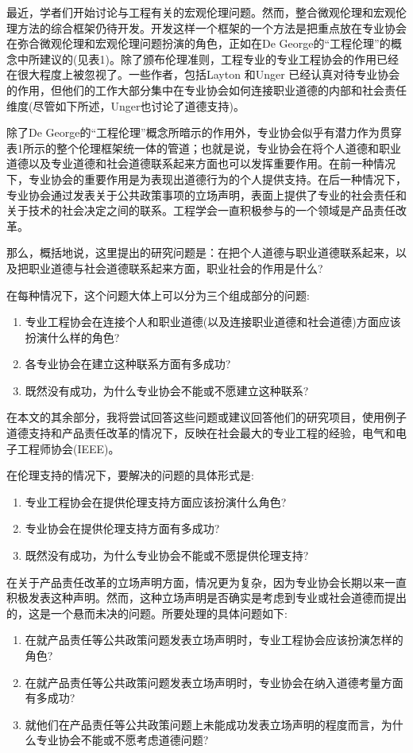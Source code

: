 \documentclass[lang=cn,11pt,a4paper]{elegantpaper}
\begin{document}
最近，学者们开始讨论与工程有关的宏观伦理问题\cite{9,10,11}。然而，整合微观伦理和宏观伦理方法的综合框架仍待开发。开发这样一个框架的一个方法是把重点放在专业协会在弥合微观伦理和宏观伦理问题扮演的角色，正如在De George的“工程伦理”的概念中所建议的(见表1)。除了颁布伦理准则，工程专业的专业工程协会的作用已经在很大程度上被忽视了。一些作者，包括Layton \cite{12}和Unger\cite{13} 已经认真对待专业协会的作用，但他们的工作大部分集中在专业协会如何连接职业道德的内部和社会责任维度(尽管如下所述，Unger也讨论了道德支持)。

除了De George的“工程伦理”概念所暗示的作用外，专业协会似乎有潜力作为贯穿表1所示的整个伦理框架统一体的管道；也就是说，专业协会在将个人道德和职业道德以及专业道德和社会道德联系起来方面也可以发挥重要作用。在前一种情况下，专业协会的重要作用是为表现出道德行为的个人提供支持。在后一种情况下，专业协会通过发表关于公共政策事项的立场声明，表面上提供了专业的社会责任和关于技术的社会决定之间的联系。工程学会一直积极参与的一个领域是产品责任改革。

那么，概括地说，这里提出的研究问题是：在把个人道德与职业道德联系起来，以及把职业道德与社会道德联系起来方面，职业社会的作用是什么?

在每种情况下，这个问题大体上可以分为三个组成部分的问题:

\begin{enumerate}
  \item 专业工程协会在连接个人和职业道德(以及连接职业道德和社会道德)方面应该扮演什么样的角色?
  \item 各专业协会在建立这种联系方面有多成功?
  \item 既然没有成功，为什么专业协会不能或不愿建立这种联系?
\end{enumerate}

在本文的其余部分，我将尝试回答这些问题或建议回答他们的研究项目，使用例子道德支持和产品责任改革的情况下，反映在社会最大的专业工程的经验，电气和电子工程师协会(IEEE)。

在伦理支持的情况下，要解决的问题的具体形式是:

\begin{enumerate}
  \item 专业工程协会在提供伦理支持方面应该扮演什么角色?
  \item 专业协会在提供伦理支持方面有多成功?
  \item 既然没有成功，为什么专业协会不能或不愿提供伦理支持?
\end{enumerate}

在关于产品责任改革的立场声明方面，情况更为复杂，因为专业协会长期以来一直积极发表这种声明。然而，这种立场声明是否确实是考虑到专业或社会道德而提出的，这是一个悬而未决的问题。所要处理的具体问题如下:
\begin{enumerate}
  \item 在就产品责任等公共政策问题发表立场声明时，专业工程协会应该扮演怎样的角色?
  \item 在就产品责任等公共政策问题发表立场声明时，专业协会在纳入道德考量方面有多成功?
  \item 就他们在产品责任等公共政策问题上未能成功发表立场声明的程度而言，为什么专业协会不能或不愿考虑道德问题?
\end{enumerate}
\end{document}
